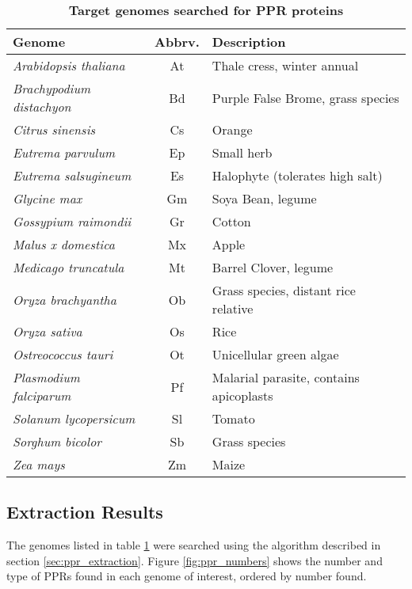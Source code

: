 \begin{table}
  \centering
  \begin{tabular}{l | c | p{7cm}}
    \textbf{Genome} & \textbf{Abbrv.} & \textbf{Description} \\ \hline
    \emph{Arabidopsis thaliana   }  & At & Thale cress, winter annual \\ \hline  
    \emph{Brachypodium distachyon}  & Bd & Purple False Brome, grass species\\ \hline
    \emph{Citrus sinensis        }  & Cs & Orange \\ \hline
    \emph{Eutrema parvulum       }  & Ep & Small herb\\ \hline
    \emph{Eutrema salsugineum    }  & Es & Halophyte (tolerates high salt) \\ \hline
    \emph{Glycine max            }  & Gm & Soya Bean, legume \\ \hline
    \emph{Gossypium raimondii    }  & Gr & Cotton \\ \hline
    \emph{Malus x domestica      }  & Mx & Apple \\ \hline
    \emph{Medicago truncatula    }  & Mt & Barrel Clover, legume \\ \hline
    \emph{Oryza brachyantha      }  & Ob & Grass species, distant rice relative\\ \hline
    \emph{Oryza sativa           }  & Os & Rice \\ \hline
    \emph{Ostreococcus tauri     }  & Ot & Unicellular green algae \\ \hline
    \emph{Plasmodium falciparum  }  & Pf & Malarial parasite, contains apicoplasts \\ \hline
    \emph{Solanum lycopersicum   }  & Sl & Tomato \\ \hline
    \emph{Sorghum bicolor        }  & Sb & Grass species \\ \hline
    \emph{Zea mays               }  & Zm & Maize \\ \hline
  \end{tabular}
  \caption{\textbf{Target genomes searched for PPR proteins}
    \label{tab:genomes}}
\end{table}

\subsection{Extraction Results}
\label{sec:survey_results}

The genomes listed in table \ref{tab:genomes} were searched using the algorithm
described in section \ref{sec:ppr_extraction}.
Figure \ref{fig:ppr_numbers} shows the number and type of PPRs found in each
genome of interest, ordered by number found.

